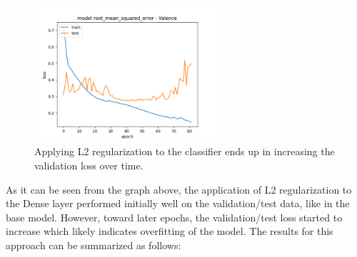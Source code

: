 \begin{figure}[H]
  \begin{center}
  \includegraphics[angle=0, width=0.6\textwidth]{Figures/rmse_out1_L2Dense.png}
  \caption{Applying L2 regularization to the classifier ends up in increasing the validation loss over time.}
  \label{fig:AblationL2Dense}
  \end{center}
\end{figure}

As it can be seen from the graph above, the application of L2 regularization to the Dense layer performed initially well on the validation/test data, like in the base model. However, toward later epochs, the validation/test loss started to increase which likely indicates overfitting of the model. The results for this approach can be summarized as follows:

